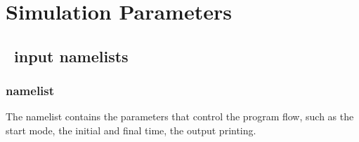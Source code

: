 \section{Simulation Parameters}
\label{section:input_par}

\subsection{\PDAC\ input namelists}
\label{section:namelists}

\subsubsection{ namelist}
The  namelist contains the parameters that control the program
flow, such as the start mode, the initial and final time, the output printing.

